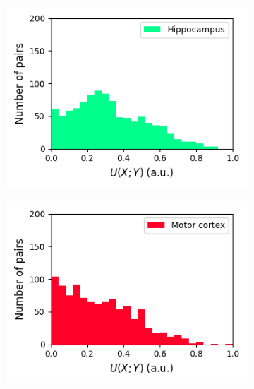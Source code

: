 \documentclass[a4paper,12pt]{article}
\theoremstyle{definition}
\begin{document}
\begin{figure}[p]
  \begin{subfigure}{0.5\textwidth}
    \centering
    \includegraphics[width=\textwidth]{figures/all_hippocampus_6_1p0_symm_unc_histogram.png}
  \end{subfigure}
  \begin{subfigure}{0.5\textwidth}
    \centering
    \includegraphics[width=\textwidth]{figures/all_motor_cortex_10_1p0_symm_unc_histogram.png}
  \end{subfigure}
  \begin{subfigure}{0.5\textwidth}
    \centering

\end{subfigure}
\end{figure}
\end{document}
